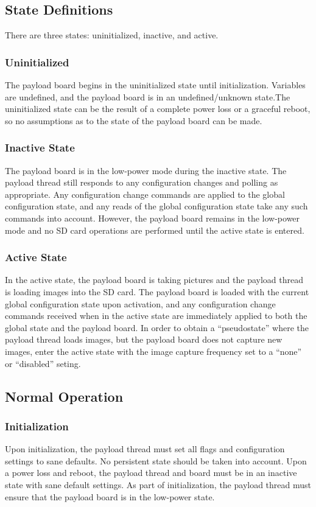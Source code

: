 \documentclass{article}
\begin{document}
\subsection{State Definitions}
There are three states: uninitialized, inactive, and active.

\subsubsection{Uninitialized}
The payload board begins in the uninitialized state until initialization.
Variables are undefined, and the payload board is in an undefined/unknown state.The uninitialized state can be the result of a complete power loss or a graceful
reboot, so no assumptions as to the state of the payload board can be made.

\subsubsection{Inactive State}
The payload board is in the low-power mode during the inactive state. The
payload thread still responds to any configuration changes and polling as
appropriate. Any configuration change commands are applied to the global
configuration state, and any reads of the global configuration state take any
such
commands into account. However, the payload board remains in the low-power mode
and no SD card operations are performed until the active state is entered.

\subsubsection{Active State}
In the active state, the payload board is taking pictures and the payload thread
is loading images into the SD card. The payload board is loaded with the current
global configuration state upon activation, and any configuration change
commands received when in the active state are immediately applied to both
the global state and the payload board.
In order to obtain a 
``pseudostate'' where the payload thread loads images, but the payload board
does not capture new images, enter the active state with the image capture
frequency set to a ``none'' or ``disabled'' seting.

\subsection{Normal Operation}
\subsubsection{Initialization}
Upon initialization, the payload thread must set all flags and configuration
settings to sane defaults. No persistent state should be taken into account. Upon
a power loss and reboot, the payload thread and board must be in an inactive state
with sane default settings. As part of initialization, the payload thread must
ensure that the payload board is in the low-power state.
\end{document}
